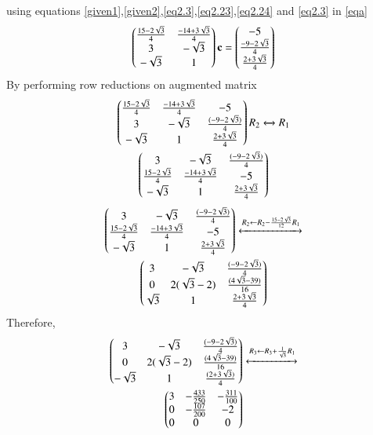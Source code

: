\documentclass[journal,12pt,twocolumn]{IEEEtran}
\begin{document}
using equations \eqref{given1},\eqref{given2},\eqref{eq2.3},\eqref{eq2.23},\eqref{eq2.24} and \eqref{eq2.3} in \eqref{eqa}
\begin{align}
    \begin{pmatrix}\frac{15-2\sqrt{3}}{4}&\frac{-14+3\sqrt{3}}{4}\\3 & -\sqrt{3}\\ -\sqrt{3}& 1\end{pmatrix}\mathbf{c} =\begin{pmatrix} -5\\\frac{-9-2\sqrt{3}}{4}\\ \frac{2+3\sqrt{3}}{4}\end{pmatrix}\label{eqcen}
\end{align}
By performing row reductions on augmented matrix
\begin{multline}
\begin{pmatrix}\frac{15-2\sqrt{3}}{4}&\frac{-14+3\sqrt{3}}{4}&-5\\3 & -\sqrt{3}&\frac{(-9-2\sqrt{3})}{4}\\ -\sqrt{3}& 1&\frac{2+3\sqrt{3}}{4}\end{pmatrix}{R_2\xleftrightarrow[]{}{R_1}}\\
\begin{pmatrix}3 & -\sqrt{3}&\frac{(-9-2\sqrt{3})}{4}\\\frac{15-2\sqrt{3}}{4}&\frac{-14+3\sqrt{3}}{4}&-5\\-\sqrt{3}& 1&\frac{2+3\sqrt{3}}{4} \end{pmatrix}
\end{multline}
\begin{multline}
\begin{pmatrix}3 & -\sqrt{3}&\frac{(-9-2\sqrt{3})}{4}\\\frac{15-2\sqrt{3}}{4}&\frac{-14+3\sqrt{3}}{4}&-5\\-\sqrt{3}& 1&\frac{2+3\sqrt{3}}{4}\end{pmatrix}
\xleftrightarrow[]{R_2\leftarrow R_2-\frac{15-2\sqrt{3}}{12}R_1}\\
\begin{pmatrix}3 & -\sqrt{3}&\frac{(-9-2\sqrt{3})}{4}\\0 & 2(\sqrt{3}-2) & \frac{(4\sqrt{3}-39)}{16}\\\sqrt{3}& 1&\frac{2+3\sqrt{3}}{4}\end{pmatrix}
\end{multline}
Therefore, 
\begin{multline}
 \begin{pmatrix}3 & -\sqrt{3}&\frac{(-9-2\sqrt{3})}{4}\\0&2(\sqrt{3}-2)&\frac{(4\sqrt{3}-39)}{16}\\-\sqrt{3}& 1&\frac{(2+3\sqrt{3})}{4}\end{pmatrix}\xleftrightarrow[]{R_3\leftarrow R_3+\frac{1}{\sqrt{3}}R_1}\\
\begin{pmatrix}3 & -\frac{433}{250}&-\frac{311}{100}\\0 & -\frac{107}{200} & -2\\0& 0&0\end{pmatrix}
\end{multline}
\renewcommand{\thefigure}{1}
\end{document}
